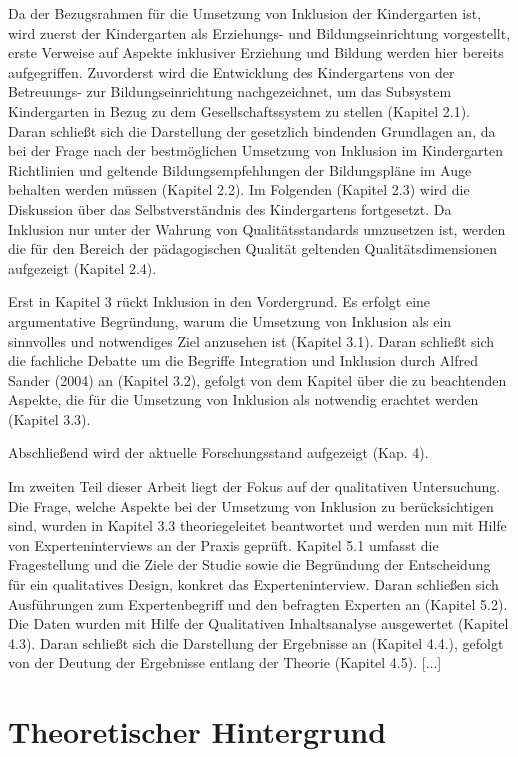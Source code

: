 Da der Bezugsrahmen für die Umsetzung von Inklusion der Kindergarten ist, wird zuerst der Kindergarten als Erziehungs- und Bildungseinrichtung vorgestellt, erste Verweise auf Aspekte inklusiver Erziehung und Bildung werden hier bereits aufgegriffen.  
Zuvorderst wird die Entwicklung des Kindergartens von der Betreuungs- zur Bildungseinrichtung nachgezeichnet, um das Subsystem Kindergarten in Bezug zu dem Gesellschaftssystem zu stellen (Kapitel 2.1). Daran schließt sich die Darstellung der gesetzlich bindenden Grundlagen an, da bei der Frage nach der bestmöglichen Umsetzung von Inklusion im Kindergarten Richtlinien und geltende Bildungsempfehlungen der Bildungspläne im Auge behalten werden müssen (Kapitel 2.2).    
Im Folgenden (Kapitel 2.3) wird die Diskussion über das Selbstverständnis des Kindergartens fortgesetzt.
Da Inklusion nur unter der Wahrung von Qualitätsstandards umzusetzen ist, werden die für den Bereich der pädagogischen Qualität geltenden Qualitätsdimensionen aufgezeigt (Kapitel 2.4).

Erst in Kapitel 3 rückt Inklusion in den Vordergrund. Es erfolgt eine argumentative Begründung, warum die Umsetzung von Inklusion als ein sinnvolles und notwendiges Ziel anzusehen ist (Kapitel 3.1). Daran schließt sich die fachliche Debatte um die Begriffe Integration und Inklusion durch Alfred Sander (2004) an (Kapitel 3.2), gefolgt von dem Kapitel über die zu beachtenden Aspekte, die für die Umsetzung von Inklusion als notwendig erachtet werden (Kapitel 3.3).
 
Abschließend wird der aktuelle Forschungsstand aufgezeigt (Kap. 4).
   
Im zweiten Teil dieser Arbeit liegt der Fokus auf der qualitativen Untersuchung. Die Frage, welche Aspekte bei der Umsetzung von Inklusion zu berücksichtigen sind, wurden in Kapitel 3.3 theoriegeleitet beantwortet und werden nun mit Hilfe von Experteninterviews an der Praxis geprüft.
Kapitel 5.1 umfasst die Fragestellung und die Ziele der Studie sowie die Begründung der Entscheidung für ein qualitatives Design, konkret das Experteninterview. Daran schließen sich Ausführungen zum  Expertenbegriff und den befragten Experten an (Kapitel 5.2). Die Daten wurden mit Hilfe der Qualitativen Inhaltsanalyse ausgewertet (Kapitel 4.3). Daran schließt sich die Darstellung der Ergebnisse an (Kapitel 4.4.), gefolgt von der Deutung der Ergebnisse entlang der Theorie (Kapitel 4.5). [...] 

\part{Theoretischer Hintergrund}
